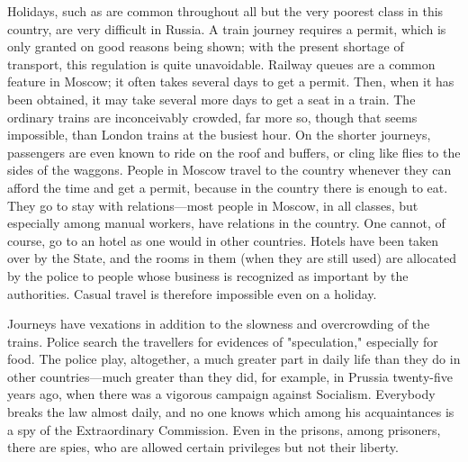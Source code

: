 Holidays, such as are common throughout all but the very poorest class in this country, are very difficult in Russia. A train journey requires a permit, which is only granted on good reasons being shown; with the present shortage of transport, this regulation is quite unavoidable. Railway queues are a common feature in Moscow; it often takes several days to get a permit. Then, when it has been obtained, it may take several more days to get a seat in a train. The ordinary trains are inconceivably crowded, far more so, though that seems impossible, than London trains at the busiest hour. On the shorter journeys, passengers are even known to ride on the roof and buffers, or cling like flies to the sides of the waggons. People in Moscow travel to the country whenever they can afford the time and get a permit, because in the country there is enough to eat. They go to stay with relations---most people in Moscow, in all classes, but especially among manual workers, have relations in the country. One cannot, of course, go to an hotel as one would in other countries. Hotels have been taken over by the State, and the rooms in them (when they are still used) are allocated by the police to people whose business is recognized as important by the authorities. Casual travel is therefore impossible even on a holiday.

Journeys have vexations in addition to the slowness and overcrowding of the trains. Police search the travellers for evidences of "speculation," especially for food. The police play, altogether, a much greater part in daily life than they do in other countries---much greater than they did, for example, in Prussia twenty-five years ago, when there was a vigorous campaign against Socialism. Everybody breaks the law almost daily, and no one knows which among his acquaintances is a spy of the Extraordinary Commission. Even in the prisons, among prisoners, there are spies, who are allowed certain privileges but not their liberty.

